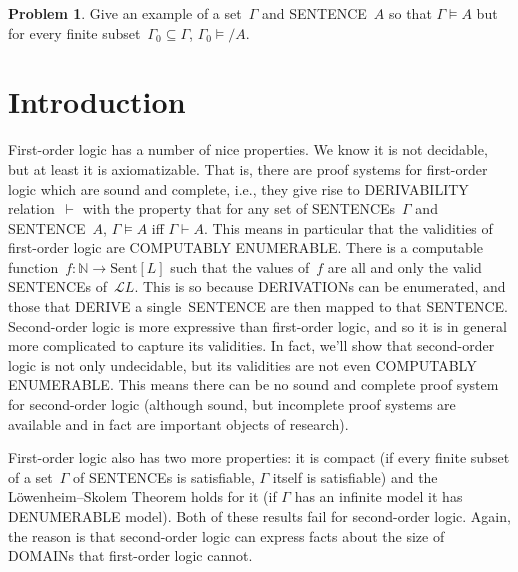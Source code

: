 \documentclass[10pt,a4paper]{article}
\newcommand*{\olup}[1]{\MakeUppercase{#1}}
\theoremstyle{plain}
\theoremstyle{definition}
\newtheorem{prob}{Problem}[section]
\theoremstyle{remark}
\newcommand*{\olfileid}[3]{}
\newcommand*{\olsection}[1]{\section*{#1}}
\providecommand{\Proves}{\mathrel{\vdash}}
\providecommand{\Entails}{\mathrel{\models}}
\providecommand{\Lang}{\ensuremath{\mathcal{L}}}
\providecommand{\Nat}{\ensuremath{\mathbb{N}}}
\providecommand{\Sent}{\mathrm{Sent}}
\begin{document}
\begin{prob}
Give an example of a set~$\Gamma$ and \olup{sentence}~$A$ so that
$\Gamma \Entails A$ but for every finite subset~$\Gamma_0 \subseteq
\Gamma$, $\Gamma_0 \Entails/ A$.
\end{prob}






\olfileid{sol}{met}{int}

\olsection{Introduction}

First-order logic has a number of nice properties. We know it is not
decidable, but at least it is axiomatizable. That is, there are proof
systems for first-order logic which are sound and complete, i.e., they
give rise to \olup{derivability} relation~$\Proves$ with the property
that for any set of \olup{sentence}s~$\Gamma$ and \olup{sentence}~$A$,
$\Gamma \Entails A$ iff $\Gamma \Proves A$.  This means in
particular that the validities of first-order logic are \olup{computably
  enumerable}. There is a computable function~$f\colon \Nat \to
\Sent[L]$ such that the values of~$f$ are all and only the valid
\olup{sentence}s of~$\Lang{L}$. This is so because \olup{derivation}s can be
enumerated, and those that \olup{derive} a single~\olup{sentence} are then
mapped to that \olup{sentence}.  Second-order logic is more expressive
than first-order logic, and so it is in general more complicated to
capture its validities.  In fact, we'll show that second-order logic
is not only undecidable, but its validities are not even \olup{computably
  enumerable}. This means there can be no sound and complete proof
system for second-order logic (although sound, but incomplete proof
systems are available and in fact are important objects of research).

First-order logic also has two more properties: it is compact (if
every finite subset of a set~$\Gamma$ of \olup{sentence}s is satisfiable,
$\Gamma$ itself is satisfiable) and the L\"owenheim--Skolem Theorem
holds for it (if $\Gamma$ has an infinite model it has
\olup{denumerable} model). Both of these results fail for second-order
logic. Again, the reason is that second-order logic can express facts
about the size of \olup{domain}s that first-order logic cannot.


\end{document}
